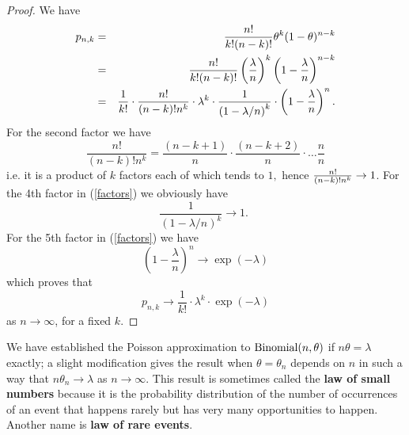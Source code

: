 \begin{proof}
We have 
\begin{eqnarray}
p_{n,k} &=&\frac{n!}{k!(n-k)!}\theta^{k}(1-\theta)^{n-k}  \notag \\
&=&\frac{n!}{k!(n-k)!}\left( \frac{\lambda }{n}\right) ^{k}\left( 1-\frac{%
\lambda }{n}\right) ^{n-k}  \notag \\
&=&\frac{1}{k!}\cdot \frac{n!}{(n-k)!n^{k}}\cdot \lambda ^{k}\cdot \frac{1}{%
\left( 1-\lambda /n\right) ^{k}}\cdot \left( 1-\frac{\lambda }{n}\right)
^{n}.  \label{factors}
\end{eqnarray}%
For the second factor we have 
\begin{equation*}
\frac{n!}{(n-k)!n^{k}}=\frac{\left( n-k+1\right) }{n}\cdot \frac{\left(
n-k+2\right) }{n}\cdot \ldots \frac{n}{n}
\end{equation*}%
i.e. it is a product of $k$ factors each of which tends to $1,$ hence $\frac{%
n!}{(n-k)!n^{k}}\rightarrow 1$. For the 4th factor in (\ref{factors}) we
obviously have 
\begin{equation*}
\frac{1}{\left( 1-\lambda /n\right) ^{k}}\rightarrow 1\text{. }
\end{equation*}%
For the 5th factor in (\ref{factors}) we have 
\begin{equation*}
\left( 1-\frac{\lambda }{n}\right) ^{n}\rightarrow \exp (-\lambda )
\end{equation*}%
which proves that 
\begin{equation*}
p_{n,k}\rightarrow \frac{1}{k!}\cdot \lambda ^{k}\cdot \exp (-\lambda )
\end{equation*}%
as $n\rightarrow \infty $, for a fixed $k.$
\end{proof}

We have established the Poisson approximation to $\mbox{{\rm Binomial}}(n,\theta)$ if $n\theta=\lambda $
exactly; a slight modification gives the result when $\theta=\theta_{n}$ depends on $n 
$ in such a way that $n\theta_{n}\rightarrow \lambda $ as $n\rightarrow \infty $.
This result is sometimes called the \textbf{law of small numbers }because it
is the probability distribution of the number of occurrences of an event
that happens rarely but has very many opportunities to happen. Another name
is {\bf law of rare events}.

